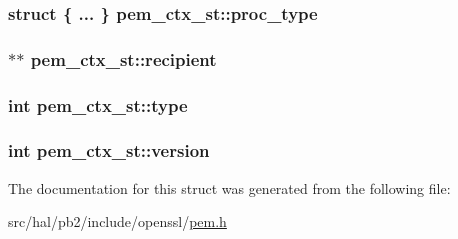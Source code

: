 \subsubsection[{\texorpdfstring{proc\+\_\+type}{proc_type}}]{\setlength{\rightskip}{0pt plus 5cm}struct \{ ... \}   pem\+\_\+ctx\+\_\+st\+::proc\+\_\+type}\hypertarget{structpem__ctx__st_a627eff176622d5ac0cb213a17ae3ce57}{}\label{structpem__ctx__st_a627eff176622d5ac0cb213a17ae3ce57}
\subsubsection[{\texorpdfstring{recipient}{recipient}}]{$\ast$$\ast$ pem\+\_\+ctx\+\_\+st\+::recipient}\hypertarget{structpem__ctx__st_afa0b3aa999aedfd5e6feb3033a818cca}{}\label{structpem__ctx__st_afa0b3aa999aedfd5e6feb3033a818cca}
\subsubsection[{\texorpdfstring{type}{type}}]{\setlength{\rightskip}{0pt plus 5cm}int pem\+\_\+ctx\+\_\+st\+::type}\hypertarget{structpem__ctx__st_aa68441b2d1bdccccc8b598a582b42793}{}\label{structpem__ctx__st_aa68441b2d1bdccccc8b598a582b42793}
\subsubsection[{\texorpdfstring{version}{version}}]{\setlength{\rightskip}{0pt plus 5cm}int pem\+\_\+ctx\+\_\+st\+::version}\hypertarget{structpem__ctx__st_a027e55d6e36ad9a227aad7ad45400fab}{}\label{structpem__ctx__st_a027e55d6e36ad9a227aad7ad45400fab}


The documentation for this struct was generated from the following file\+:\begin{DoxyCompactItemize}
\item 
src/hal/pb2/include/openssl/\hyperlink{pem_8h}{pem.\+h}\end{DoxyCompactItemize}
